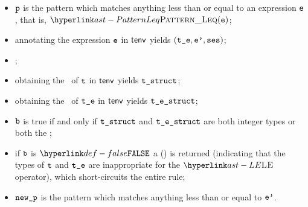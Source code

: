 \ProseParagraph
\AllApply
\begin{itemize}
\item $\vp$ is the pattern which matches anything less than or equal to an expression $\ve$,
that is, $\PatternLeq(\ve)$;
\item annotating the expression $\ve$ in $\tenv$ yields $(\vte, \vep, \vses)$\ProseOrTypeError;
\item \Prosechecksymbolicallyevaluable{$\vses$};
\item obtaining the \underlyingtype\ of $\vt$ in $\tenv$ yields $\vtstruct$\ProseOrTypeError;
\item obtaining the \underlyingtype\ of $\vte$ in $\tenv$ yields $\testruct$\ProseOrTypeError;
\item $\vb$ is true if and only if $\vtstruct$ and $\testruct$ are both integer types or both the \realtypeterm{};
\item if $\vb$ is $\False$ a \typingerrorterm{} (\BadOperands) is returned (indicating that the types of $\vt$ and $\vte$
      are inappropriate for the $\LE$ operator),
      which short-circuits the entire rule;
\item $\newp$ is the pattern which matches anything less than or equal to $\vep$.
\end{itemize}

\FormallyParagraph
\begin{mathpar}
\end{mathpar}

